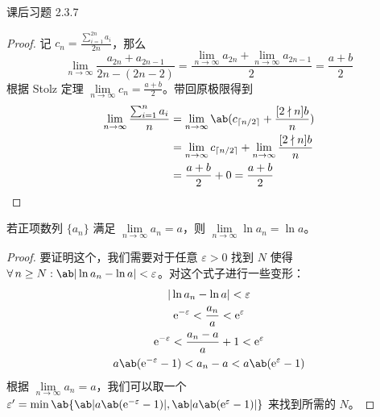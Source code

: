 \begin{problem}
	课后习题 2.3.7

	\begin{proof}
		记 $c_n = \frac{\sum_{i=1}^{2n} a_i}{2n}$，那么
		$$
		\lim_{n \to \infty} \frac{a_{2n} + a_{2n - 1}}{2n - (2n - 2)} = \frac{\lim\limits_{n \to \infty} a_{2n} + \lim\limits_{n \to \infty} a_{2n - 1}}{2} = \frac{a + b}{2}
		$$
		根据 Stolz 定理 $\lim\limits_{n \to \infty} c_n = \frac{a + b}{2}$。带回原极限得到
		$$
		\begin{aligned}
			\lim_{n \to \infty} \frac{\sum_{i=1}^n a_i}{n} & = \lim_{n \to \infty} \ab(c_{\ceil{n/2}} + \frac{[2 \nmid n] b}{n}) \\
			& = \lim_{n \to \infty} c_{\ceil{n/2}} + \lim_{n \to \infty} \frac{[2 \nmid n] b}{n} \\
			& = \frac{a + b}{2} + 0 = \frac{a + b}{2}
		\end{aligned}
		$$
	\end{proof}
\end{problem}

\begin{lemma}
	若正项数列 $\{a_n\}$ 满足 $\lim\limits_{n \to \infty} a_n = a$，则 $\lim\limits_{n \to \infty} \ln a_n = \ln a$。

	\begin{proof}
		要证明这个，我们需要对于任意 $\varepsilon > 0$ 找到 $N$ 使得 $\forall\,n \ge N: \ab|\ln a_n - \ln a| < \varepsilon$。对这个式子进行一些变形：
		$$
		\begin{gathered}
			|\ln a_n - \ln a| < \varepsilon \\
			\E^{-\varepsilon} < \frac{a_n}{a} < \E^{\varepsilon} \\
			\E^{-\varepsilon} < \frac{a_n - a}{a} + 1 < \E^{\varepsilon} \\
			a \ab(\E^{-\varepsilon} - 1) < a_n - a < a \ab(\E^{\varepsilon} - 1) \\
		\end{gathered}
		$$
		根据 $\lim\limits_{n \to \infty} a_n = a$，我们可以取一个 $\varepsilon' = \min\ab\{\ab|a \ab(\E^{-\varepsilon} - 1)|, \ab|a \ab(\E^{\varepsilon} - 1)|\}$ 来找到所需的 $N$。
	\end{proof}
\end{lemma}


